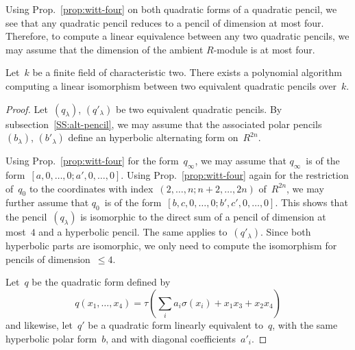 \documentclass{article}%
\begin{document}
Using Prop.~\ref{prop:witt-four} on both quadratic forms of a quadratic
pencil, we see that any quadratic pencil reduces to a pencil of dimension
at most four.
Therefore, to compute a linear equivalence between any two quadratic
pencils, we may assume that the dimension of the ambient $R$-module is at
most four.

\begin{prop}\label{prop:ip1s-bin-polynomial}%
Let~$k$ be a finite field of characteristic two.
There exists a polynomial algorithm computing a linear isomorphism between
two equivalent quadratic pencils over~$k$.
\end{prop}

\begin{proof}
Let~$(q_{λ})$, $(q'_{λ})$ be two equivalent quadratic pencils.
By subsection~\ref{SS:alt-pencil}, we may assume that
the associated polar pencils~$(b_{λ})$, $(b'_{λ})$
define an hyperbolic alternating form on~$R^{2n}$.

Using Prop.~\ref{prop:witt-four} for the form~$q_{∞}$,
we may assume that $q_{∞}$~is of the form~$[a, 0, …, 0; a', 0, …, 0]$.
Using Prop.~\ref{prop:witt-four} again for the restriction of~$q_{0}$
to the coordinates with index~$(2, …,  n; n+2, …, 2n)$ of~$R^{2n}$,
we may further assume that
$q_{0}$~is of the form~$[b, c, 0, …, 0; b', c', 0, …, 0]$.
This shows that the pencil~$(q_{λ})$ is isomorphic to
the direct sum of a pencil of dimension at most~$4$
and a hyperbolic pencil.
The same applies to~$(q'_{λ})$.
Since both hyperbolic parts are isomorphic,
we only need to compute the isomorphism for pencils of dimension~$≤ 4$.

Let~$q$ be the quadratic form defined by
\begin{equation}
q(x_1, …, x_4) = τ (∑_{i} a_i σ(x_i) + x_1 x_3 + x_2 x_4)
\end{equation}
and likewise, let~$q'$ be a quadratic form linearly equivalent to~$q$,
with the same hyperbolic polar form~$b$,
and with diagonal coefficients~$a'_i$.


\end{proof}
\end{document}
